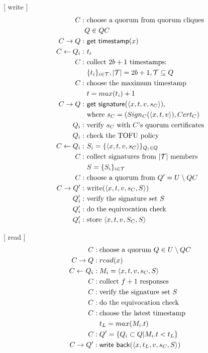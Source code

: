 [ {\sf write} ]
\begin{align*}
  C :& \text{ choose a quorum from quorum cliques} \\
     & Q \in QC \\
  C \rightarrow Q :& \text{ {\sf get timestamp}}(x) \\
  C \leftarrow Q_i :& \text{ } t_i \\
  C :& \text{ collect } 2b+1 \text{ timestamps: } \\
     & \text{ } \{t_i\}_{i \in \mathcal{T}}, |\mathcal{T}|=2b+1,
       \mathcal{T} \subseteq Q \\
  C :& \text{ choose the maximum timestamp } \\
     & \text{ } t = max(t_i) + 1 \\
  C \rightarrow Q :& \text{ {\sf get signature}}(\langle x, t, v, s_C \rangle),\\
     & \text{ where } s_C = (Sign_C(\langle x, t, v \rangle), Cert_C) \\
  Q_i :& \text{ verify $s_C$ with $C$'s quorum certificates} \\
  Q_i :& \text{ check the TOFU policy} \\
  C \leftarrow Q_i :& \text{ } S_i = \{\langle x, t, v, s_C
  \rangle\}_{Q_i \in Q} \\
  C :& \text{ collect signatures from $|\mathcal{T}|$ members} \\
     & \text{ } S = \{S_i\}_{i \in \mathcal{T}} \\
  C :& \text{ choose a quorum from } Q' = U \setminus QC \\
  C \rightarrow Q' :& \text{ write}(\langle x, t, v, s_C, S \rangle) \\
  Q'_i :& \text{ verify the signature set $S$} \\
  Q'_i :& \text{ do the equivocation check} \\
  Q'_i :& \text{ store } \langle x, t, v, S_C, S \rangle
\end{align*}

[ {\sf read} ]
\setcounter{equation}{0}
\begin{align*}
  C :&\; \text{choose a quorum } Q \in U \setminus QC \\
  C \rightarrow Q :&\; read(x) \\
  C \leftarrow Q_i :&\; M_i = \langle x, t, v, s_C, S \rangle \\
  C :&\; \text{collect } f + 1 \text{ responses} \\
  C :&\; \text{verify the signature set $S$} \\
  C :&\; \text{do the equivocation check} \\
  C :&\; \text{choose the latest timestamp } \\
     &\; t_L = max(M_i.t) \\
  C :&\; Q' = \{Q_i \subset Q | M_i.t < t_L\} \\
  C \rightarrow Q' :&\; \text{{\sf write back}}(\langle x, t_L, v, s_C, S \rangle)
\end{align*}


